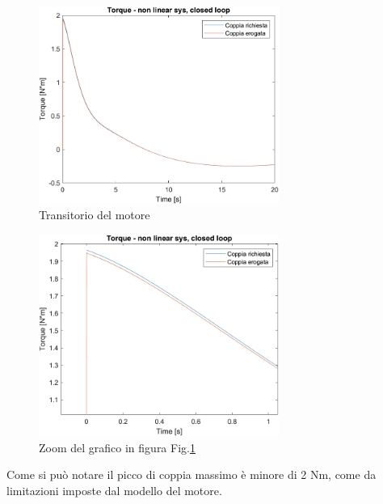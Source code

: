 \begin{figure}[H]
	\centering   	
	\includegraphics[width=0.7\textwidth]{Immagini/motore.png}
	\caption{Transitorio del motore}
	\label{fig:motore}
\end{figure}
\begin{figure}[H]
	\centering   	
	\includegraphics[width=0.7\textwidth]{Immagini/motore_zoom.png}
	\caption{Zoom del grafico in figura Fig.\ref{fig:motore}}
	\label{fig:motore_zoom}
\end{figure}

Come si può notare il picco di coppia massimo è minore di 2 Nm, come da limitazioni imposte dal modello del motore.

